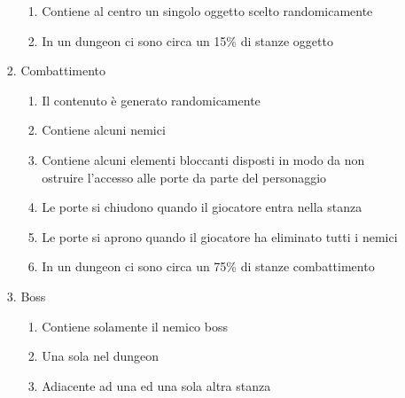 \begin{enumerate}
\begin{enumerate}
\begin{enumerate}
\begin{enumerate}
                        \item Contiene al centro un singolo oggetto scelto randomicamente
                        \item In un dungeon ci sono circa un 15\% di stanze oggetto
                    \end{enumerate}
                \item Combattimento
                    \begin{enumerate}
                        \item Il contenuto è generato randomicamente
                        \item Contiene alcuni nemici
                        \item Contiene alcuni elementi bloccanti disposti in modo da non ostruire l'accesso alle porte da parte del personaggio
                        \item Le porte si chiudono quando il giocatore entra nella stanza
                        \item Le porte si aprono quando il giocatore ha eliminato tutti i nemici
                        \item In un dungeon ci sono circa un 75\% di stanze combattimento
                    \end{enumerate}
                \item Boss
                    \begin{enumerate}
                        \item Contiene solamente il nemico boss
                        \item Una sola nel dungeon
                        \item Adiacente ad una ed una sola altra stanza
                    \end{enumerate}
            \end{enumerate}
        
        
    \end{enumerate}


\end{enumerate}
